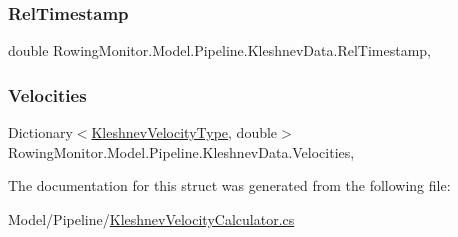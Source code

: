 \subsubsection{\texorpdfstring{Rel\+Timestamp}{RelTimestamp}}
{\footnotesize\ttfamily double Rowing\+Monitor.\+Model.\+Pipeline.\+Kleshnev\+Data.\+Rel\+Timestamp\hspace{0.3cm}{\ttfamily [get]}, {\ttfamily [set]}}

\mbox{\label{struct_rowing_monitor_1_1_model_1_1_pipeline_1_1_kleshnev_data_a62142432ba1620e06b133e9119b33493}} 
\subsubsection{\texorpdfstring{Velocities}{Velocities}}
{\footnotesize\ttfamily Dictionary$<$\hyperlink{namespace_rowing_monitor_1_1_model_1_1_util_a45e0956b123d438555a1cb3997bd5cb4}{Kleshnev\+Velocity\+Type}, double$>$ Rowing\+Monitor.\+Model.\+Pipeline.\+Kleshnev\+Data.\+Velocities\hspace{0.3cm}{\ttfamily [get]}, {\ttfamily [set]}}



The documentation for this struct was generated from the following file\+:\begin{DoxyCompactItemize}
\item 
Model/\+Pipeline/\hyperlink{_kleshnev_velocity_calculator_8cs}{Kleshnev\+Velocity\+Calculator.\+cs}\end{DoxyCompactItemize}
